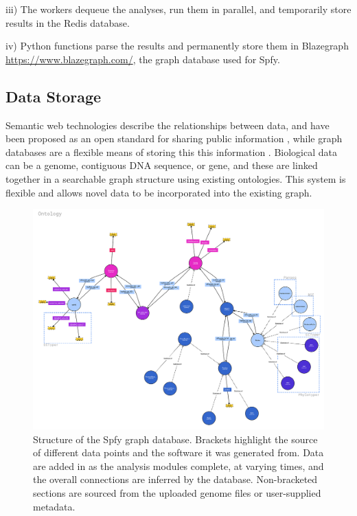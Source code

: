 \documentclass{article}
\begin{document}
iii) The workers dequeue the analyses, run them in parallel, and temporarily store results in the Redis database.

iv) Python functions parse the results and permanently store them in Blazegraph \url{https://www.blazegraph.com/}, the graph database used for Spfy.

\subsection{Data Storage}
Semantic web technologies describe the relationships between data, and have been proposed as an open standard for sharing public information \cite{berners2001semantic}, while graph databases are a flexible means of storing this this information \cite{horrocks2005semantic}. Biological data can be a genome, contiguous DNA sequence, or gene, and these are linked together in a searchable graph structure using existing ontologies. This system is flexible and allows novel data to be incorporated into the existing graph.

\begin{figure}[!hb]
\begin{center}
\includegraphics[width=\textwidth]{images/ontology}
\end{center}
\caption{Structure of the Spfy graph database. Brackets highlight the source of different data points and the software it was generated from. Data are added in as the analysis modules complete, at varying times, and the overall connections are inferred by the database. Non-bracketed sections are sourced from the uploaded genome files or user-supplied metadata.}
\label{fig-ontology}
\end{figure}
\end{document}
